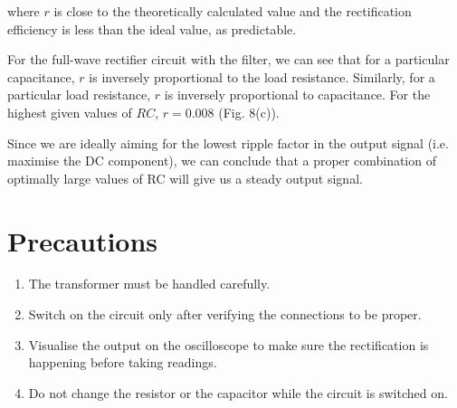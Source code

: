 where $r$ is close to the theoretically calculated value and the rectification efficiency is less than the ideal value, as predictable.

For the full-wave rectifier circuit with the filter, we can see that for a particular capacitance, $r$ is inversely proportional to the load resistance. Similarly, for a particular load resistance, $r$ is inversely proportional to capacitance. For the highest given values of $RC$, $r = 0.008$ (Fig. 8(c)). 

Since we are ideally aiming for the lowest ripple factor in the output signal (i.e. maximise the DC component), we can conclude that a proper combination of optimally large values of RC will give us a steady output signal.

\section{Precautions}
\begin{enumerate}
    \item The transformer must be handled carefully.
    \item Switch on the circuit only after verifying the connections to be proper.
    \item Visualise the output on the oscilloscope to make sure the rectification is happening before taking readings.
    \item Do not change the resistor or the capacitor while the circuit is switched on.
\end{enumerate}